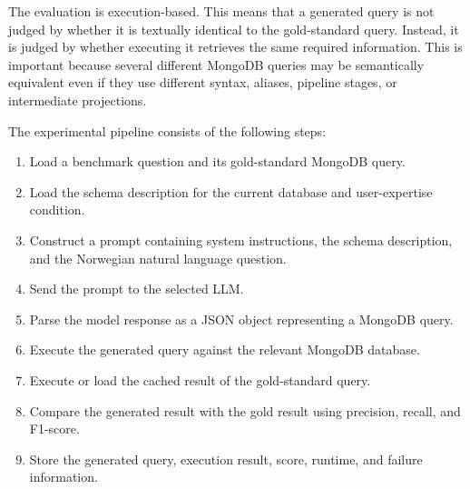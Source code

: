 The evaluation is execution-based. This means that a generated query is not judged by whether it is textually identical to the gold-standard query. Instead, it is judged by whether executing it retrieves the same required information. This is important because several different MongoDB queries may be semantically equivalent even if they use different syntax, aliases, pipeline stages, or intermediate projections.

The experimental pipeline consists of the following steps:

\begin{enumerate}
    \item Load a benchmark question and its gold-standard MongoDB query.
    \item Load the schema description for the current database and user-expertise condition.
    \item Construct a prompt containing system instructions, the schema description, and the Norwegian natural language question.
    \item Send the prompt to the selected LLM.
    \item Parse the model response as a JSON object representing a MongoDB query.
    \item Execute the generated query against the relevant MongoDB database.
    \item Execute or load the cached result of the gold-standard query.
    \item Compare the generated result with the gold result using precision, recall, and F1-score.
    \item Store the generated query, execution result, score, runtime, and failure information.
\end{enumerate}


